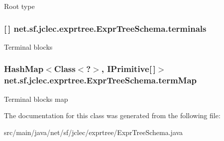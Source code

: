 Root type \hypertarget{classnet_1_1sf_1_1jclec_1_1exprtree_1_1_expr_tree_schema_aa60f19ae52e55d9ed07ca1089c88d65a}{
\subsubsection[{terminals}]{ \mbox{[}$\,$\mbox{]} net.\-sf.\-jclec.\-exprtree.\-Expr\-Tree\-Schema.\-terminals\hspace{0.3cm}{\ttfamily [protected]}}}\label{classnet_1_1sf_1_1jclec_1_1exprtree_1_1_expr_tree_schema_aa60f19ae52e55d9ed07ca1089c88d65a}
Terminal blocks \hypertarget{classnet_1_1sf_1_1jclec_1_1exprtree_1_1_expr_tree_schema_acef767f8d25191e8d2fa6ef1c9bf5ae4}{
\subsubsection[{term\-Map}]{\setlength{\rightskip}{0pt plus 5cm}Hash\-Map$<$Class$<$?$>$, {\bf I\-Primitive}\mbox{[}$\,$\mbox{]}$>$ net.\-sf.\-jclec.\-exprtree.\-Expr\-Tree\-Schema.\-term\-Map\hspace{0.3cm}{\ttfamily [protected]}}}\label{classnet_1_1sf_1_1jclec_1_1exprtree_1_1_expr_tree_schema_acef767f8d25191e8d2fa6ef1c9bf5ae4}
Terminal blocks map 

The documentation for this class was generated from the following file\-:\begin{DoxyCompactItemize}
\item 
src/main/java/net/sf/jclec/exprtree/Expr\-Tree\-Schema.\-java\end{DoxyCompactItemize}
